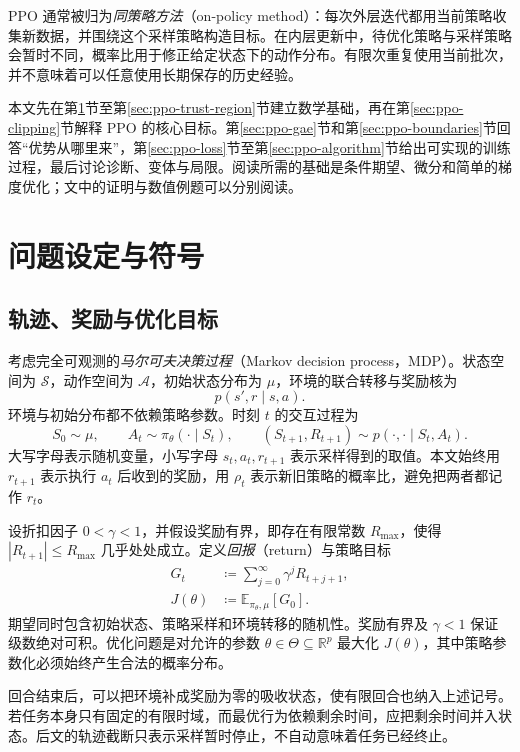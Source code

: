 \documentclass[UTF8,12pt,a4paper,fontset=fandol]{ctexart}
\begin{document}
PPO 通常被归为\emph{同策略方法}（on-policy method）：每次外层迭代都用当前策略收集新数据，并围绕这个采样策略构造目标。在内层更新中，待优化策略与采样策略会暂时不同，概率比用于修正给定状态下的动作分布。有限次重复使用当前批次，并不意味着可以任意使用长期保存的历史经验。

本文先在第\ref{sec:ppo-mdp}节至第\ref{sec:ppo-trust-region}节建立数学基础，再在第\ref{sec:ppo-clipping}节解释 PPO 的核心目标。第\ref{sec:ppo-gae}节和第\ref{sec:ppo-boundaries}节回答“优势从哪里来”，第\ref{sec:ppo-loss}节至第\ref{sec:ppo-algorithm}节给出可实现的训练过程，最后讨论诊断、变体与局限。阅读所需的基础是条件期望、微分和简单的梯度优化；文中的证明与数值例题可以分别阅读。

\section{问题设定与符号}
\label{sec:ppo-mdp}

\subsection{轨迹、奖励与优化目标}

考虑完全可观测的\emph{马尔可夫决策过程}（Markov decision process，MDP）。状态空间为 $\mathcal S$，动作空间为 $\mathcal A$，初始状态分布为 $\mu$，环境的联合转移与奖励核为
\[
  p(s',r\mid s,a).
\]
环境与初始分布都不依赖策略参数。时刻 $t$ 的交互过程为
\[
  S_0\sim\mu,\qquad
  A_t\sim\pi_\theta(\cdot\mid S_t),\qquad
  (S_{t+1},R_{t+1})\sim p(\cdot,\cdot\mid S_t,A_t).
\]
大写字母表示随机变量，小写字母 $s_t,a_t,r_{t+1}$ 表示采样得到的取值。本文始终用 $r_{t+1}$ 表示执行 $a_t$ 后收到的奖励，用 $\rho_t$ 表示新旧策略的概率比，避免把两者都记作 $r_t$。

设折扣因子 $0<\gamma<1$，并假设奖励有界，即存在有限常数 $R_{\max}$，使得 $|R_{t+1}|\le R_{\max}$ 几乎处处成立。定义\emph{回报}（return）与策略目标
\begin{align}
  G_t &\coloneqq \sum_{j=0}^{\infty}\gamma^jR_{t+j+1},
  \label{eq:ppo-return}\\
  J(\theta)&\coloneqq
  \mathbb E_{\pi_\theta,\mu}[G_0].
  \label{eq:ppo-performance}
\end{align}
期望同时包含初始状态、策略采样和环境转移的随机性。奖励有界及 $\gamma<1$ 保证级数绝对可积。优化问题是对允许的参数 $\theta\in\Theta\subseteq\mathbb R^p$ 最大化 $J(\theta)$，其中策略参数化必须始终产生合法的概率分布。

回合结束后，可以把环境补成奖励为零的吸收状态，使有限回合也纳入上述记号。若任务本身只有固定的有限时域，而最优行为依赖剩余时间，应把剩余时间并入状态。后文的轨迹截断只表示采样暂时停止，不自动意味着任务已经终止。
\end{document}
